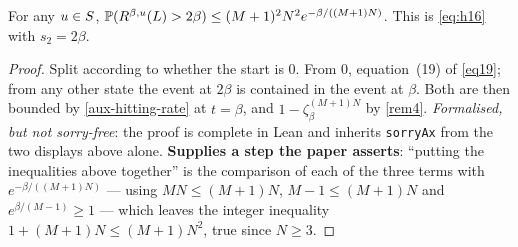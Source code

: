 \begin{lemma}
  \label{lem13}
  \leanok
  For any $u \in S$,
  $\mathbb{P}(R^{\beta,u}(L) > 2\beta) \le (M+1)^2 N^2 e^{-\beta/((M+1)N)}$.
  This is \eqref{eq:h16} with $s_2 = 2\beta$.
\end{lemma}
\begin{proof}
  \leanok
  Split according to whether the start is $0$.  From $0$, equation~(19) of
  \ref{eq19}; from any other state the event at $2\beta$ is contained in the
  event at $\beta$.  Both are then bounded by \ref{aux-hitting-rate} at $t =
  \beta$, and $1 - \zeta_\beta^{(M+1)N}$ by \ref{rem4}. \emph{Formalised, but
  not sorry-free}: the proof is complete in Lean and inherits \texttt{sorryAx}
  from the two displays above alone. \textbf{Supplies a step the paper
  asserts}: ``putting the inequalities above together'' is the comparison of
  each of the three terms with $e^{-\beta/((M+1)N)}$ --- using $MN \le (M+1)N$,
  $M-1 \le (M+1)N$ and $e^{\beta/(M-1)} \ge 1$ --- which leaves the integer
  inequality $1 + (M+1)N \le (M+1)N^2$, true since $N \ge 3$.
\end{proof}

